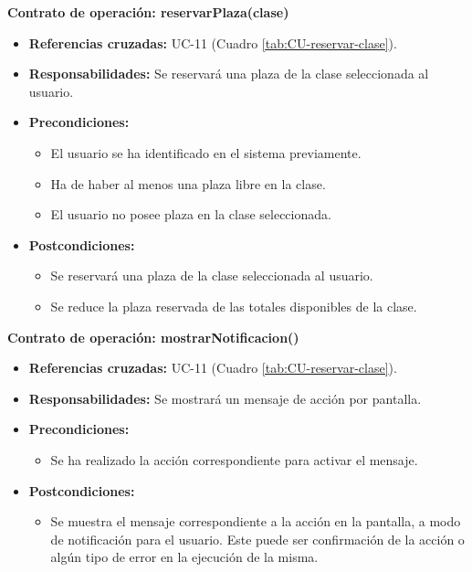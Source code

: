 \textbf{Contrato de operación: reservarPlaza(clase)}
\begin{itemize}
\item \textbf{Referencias cruzadas:} UC-11 (Cuadro \ref{tab:CU-reservar-clase}).
\item \textbf{Responsabilidades:} Se reservará una plaza de la clase seleccionada al usuario.
\item \textbf{Precondiciones:} 
 \begin{itemize}
\item El usuario se ha identificado en el sistema previamente.
\item Ha de haber al menos una plaza libre en la clase.
\item El usuario no posee plaza en la clase seleccionada.
\end {itemize}
\item \textbf{Postcondiciones:} 
 \begin{itemize}
\item Se reservará una plaza de la clase seleccionada al usuario.
\item Se reduce la plaza reservada de las totales disponibles de la clase.
\end {itemize}
\end {itemize}

\textbf{Contrato de operación: mostrarNotificacion()}
\begin{itemize}
\item \textbf{Referencias cruzadas:} UC-11 (Cuadro \ref{tab:CU-reservar-clase}).
\item \textbf{Responsabilidades:} Se mostrará un mensaje de acción por pantalla.
\item \textbf{Precondiciones:} 
 \begin{itemize}
\item Se ha realizado la acción correspondiente para activar el mensaje.
\end {itemize}
\item \textbf{Postcondiciones:} 
 \begin{itemize}
\item Se muestra el mensaje correspondiente a la acción en la pantalla, a modo de notificación para el usuario. Este puede ser confirmación de la acción o algún tipo de error en la ejecución de la misma.
\end {itemize}
\end {itemize}


\vspace{10mm}

